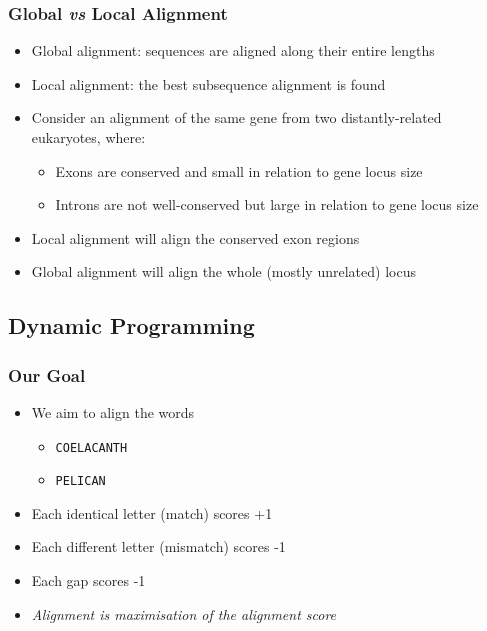 \documentclass[table]{beamer}
\begin{document}
    \begin{frame}
     \frametitle{Global \textit{vs} Local Alignment}
     \begin{itemize}
       \item<1-> Global alignment: sequences are aligned along their entire lengths
       \item<1-> Local alignment: the best subsequence alignment is found
       \item<2-> Consider an alignment of the same gene from two distantly-related eukaryotes, where:
         \begin{itemize}
           \item<2-> Exons are conserved and small in relation to gene locus size
           \item<2-> Introns are not well-conserved but large in relation to gene locus size
         \end{itemize}
       \item<2-> Local alignment will align the conserved exon regions
       \item<2-> Global alignment will align the whole (mostly unrelated) locus
     \end{itemize}
    \end{frame}

	\subsection{Dynamic Programming}
    \begin{frame}
     \frametitle{Our Goal}
     \begin{itemize}
       \item<1-> We aim to align the words
       \begin{itemize}
         \item<1-> \texttt{COELACANTH}
         \item<1-> \texttt{PELICAN}
       \end{itemize}
       \item<2-> Each identical letter (match) scores +1
       \item<2-> Each different letter (mismatch) scores -1
       \item<2-> Each gap scores -1
       \item<3-> \emph{Alignment is maximisation of the alignment score}
     \end{itemize}
    \end{frame}   
   
\end{document}
